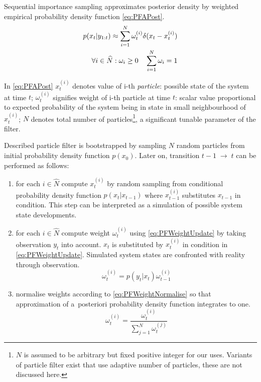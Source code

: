 \documentclass[a4paper,12pt,oneside]{report}
\newcommand{\pdf}{probability density function}
\begin{document}
Sequential importance sampling approximates posterior density by weighted empirical
{\pdf} \eqref{eq:PFAPost}.
\begin{align}
	p(x_t | y_{1:t}) \approx \sum_{i=1}^N \omega_t^{(i)} \delta(x_t - x_t^{(i)}) \label{eq:PFAPost} \\
	\forall i \in \widehat{N}: \omega_i \geq 0 \quad \sum_{i=1}^N \omega_i = 1 \notag
\end{align}

In \eqref{eq:PFAPost} \(x_t^{(i)}\) denotes value of i-th \emph{particle}: possible state of the
system at time \(t\);
\(\omega_t^{(i)}\) signifies weight of i-th particle at time \(t\): scalar value proportional to
expected probability of the system being in state in small neighbourhood of \(x_t^{(i)}\);
\(N\) denotes total number of particles\footnote{\(N\) is assumed to be
arbitrary but fixed positive integer for our uses. Variants of particle filter exist that use
adaptive number of particles, these are not discussed here.}, a significant tunable parameter
of the filter.

Described particle filter is bootstrapped by sampling \(N\) random particles from initial {\pdf}
\(p(x_0)\). Later on, transition \(t-1 \; \rightarrow \; t\) can be performed as follows:
\begin{enumerate}
	\item for each \(i \in \widehat{N}\) compute \(x_t^{(i)}\) by random sampling from conditional {\pdf}
		\(p(x_t|x_{t-1})\) where \(x_{t-1}^{(i)}\) substitutes \(x_{t-1}\) in condition. This step
		can be interpreted as a simulation of possible system state developments.
	\item for each \(i \in \widehat{N}\) compute weight \(\omega_t^{(i)}\) using \eqref{eq:PFWeightUpdate}
		by taking observation \(y_t\) into account. \(x_t\) is substituted by \(x_t^{(i)}\) in
		condition in \eqref{eq:PFWeightUpdate}. Simulated system states are confronted with reality
		through observation.
		\begin{equation} \label{eq:PFWeightUpdate}
			\omega_t^{(i)} = p(y_t | x_t) \omega_{t-1}^{(i)}
		\end{equation}
	\item normalise weights according to \eqref{eq:PFWeightNormalise} so that approximation of
		a~posteriori {\pdf} integrates to one.
		\begin{equation} \label{eq:PFWeightNormalise}
			\omega_t^{(i)} = \frac{\omega_t^{(i)}}{\sum_{j=1}^N \omega_t^{(j)}}
		\end{equation}
\end{enumerate}
\end{document}
